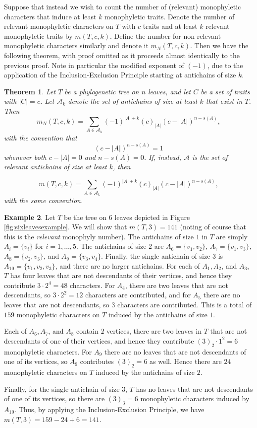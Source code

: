 \documentclass{amsart}
\newtheorem{theorem}{Theorem}
\theoremstyle{definition}
\newtheorem{example}[theorem]{Example}
\begin{document}
Suppose that instead we wish to count the number of (relevant) monophyletic characters that induce at least $k$ monophyletic traits. Denote the number of relevant monophyletic characters on $T$ with $c$ traits and at least $k$ relevant monophyletic traits by $m(T,c,k)$. Define the number for non-relevant monophyletic characters similarly and denote it $m_N(T,c,k)$. Then we have the following theorem, with proof omitted as it proceeds almost identically to the previous proof. Note in particular the modified exponent of $(-1)$, due to the application of the Inclusion-Exclusion Principle starting at antichains of size $k$.

\begin{theorem}
Let $T$ be a phylogenetic tree on $n$ leaves, and let $C$ be a set of traits with $|C|=c$. Let $\mathcal{A}_k$ denote the set of antichains of size at least $k$ that exist in $T$. Then
\[
m_N(T,c,k)
=
\sum_{A\in \mathcal{A}_k}
(-1)^{|A|+k}
(c)_{|A|}
(c-|A|)^{n-s(A)},
\]
with the convention that
\[
(c-|A|)^{n-s(A)}=1
\]
whenever both $c-|A|=0$ and $n-s(A)=0$. If, instead, $\mathcal{A}$ is the set of relevant antichains of size at least $k$, then

\[
m(T,c,k)
=
\sum_{A\in \mathcal{A}_k}
(-1)^{|A|+k}
(c)_{|A|}
(c-|A|)^{n-s(A)},
\]
with the same convention.
\end{theorem}


\begin{example}
    Let $T$ be the tree on $6$ leaves depicted in Figure \ref{fig:sixleavesexample}. We will show that $m(T,3)=141$ (noting of course that this is the \emph{relevant} monophyly number). The antichains of size $1$ in $T$ are simply $A_i=\{v_i\}$ for $i=1,\dots,5$. The antichains of size $2$ are $A_6=\{v_1,v_2\}$, $A_7=\{v_1,v_3\}$, $A_8=\{v_2,v_3\}$, and $A_9= \{v_3,v_4\}$. Finally, the single antichain of size $3$ is $A_{10}=\{v_1,v_2,v_3\}$, and there are no larger antichains. For each of $A_1,A_2$, and $A_3$, $T$ has four leaves that are not descendants of their vertices, and hence they contribute $3\cdot2^4=48$ characters. For $A_4$, there are two leaves that are not descendants, so $3\cdot2^2=12$ characters are contributed, and for $A_5$ there are no leaves that are not descendants, so $3$ characters are contributed. This is a total of $159$ monophyletic characters on $T$ induced by the antichains of size $1$.

    Each of $A_6,A_7$, and $A_8$ contain $2$ vertices, there are two leaves in $T$ that are not descendants of one of their vertices, and hence they contribute $(3)_2 \cdot 1^2 =6$ monophyletic characters. For $A_9$ there are no leaves that are not descendants of one of its vertices, so $A_9$ contributes $(3)_2=6$ as well. Hence there are $24$ monophyletic characters on $T$ induced by the antichains of size $2$.

    Finally, for the single antichain of size $3$, $T$ has no leaves that are not descendants of one of its vertices, so there are $(3)_3=6$ monophyletic characters induced by $A_{10}$. Thus, by applying the Inclusion-Exclusion Principle, we have $m(T,3)=159-24+6=141$. 
\end{example}
\end{document}
